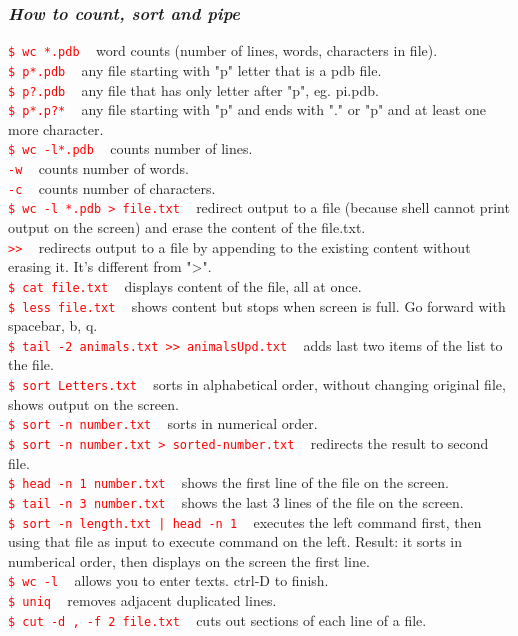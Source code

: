 \documentclass{article}
\begin{document}
{\subsubsection{\small\textsl{How to count, sort and pipe}}
\textcolor{red}{\texttt{\$ wc *.pdb}} ~ word counts (number of lines, words, characters in file). \\
\textcolor{red}{\texttt{\$ p*.pdb}} ~	any file starting with "p" letter that is a pdb file.\\
\textcolor{red}{\texttt{\$ p?.pdb}} ~ any file that has only letter after "p", eg. pi.pdb.\\
\textcolor{red}{\texttt{\$ p*.p?*}} ~	 any file starting with "p" and ends with "." or "p" and at least one more character.\\
\textcolor{red}{\texttt{\$ wc -l*.pdb}} ~	 counts number of lines.\\
\indent\indent \textcolor{red}{\texttt{-w}} ~	counts number of words.\\ 
\indent\indent \textcolor{red}{\texttt{-c}} ~	counts number of characters.\\
\textcolor{red}{\texttt{\$ wc -l *.pdb > file.txt}} ~	 redirect output to a file (because shell cannot print output on the screen) and erase the content of the file.txt. \\
\textcolor{red}{\texttt{>>}} ~	redirects output to a file by appending to the existing content without erasing it. It's different from ">".\\
\textcolor{red}{\texttt{\$ cat file.txt}} ~ displays content of the file, all at once.\\
\textcolor{red}{\texttt{\$ less file.txt}} ~	shows content but stops when screen is full. Go forward with spacebar, b, q. \\
\textcolor{red}{\texttt{\$ tail -2 animals.txt >> animalsUpd.txt}} ~	adds last two items of the list to the file.\\
\textcolor{red}{\texttt{\$ sort Letters.txt}} ~  sorts in alphabetical order, without changing original file, shows output on the screen.\\
\textcolor{red}{\texttt{\$ sort -n number.txt}} ~	sorts in numerical order.\\
\textcolor{red}{\texttt{\$ sort -n number.txt > sorted-number.txt}} ~ redirects the result to second file.\\
\textcolor{red}{\texttt{\$ head -n 1 number.txt}} ~ shows the first line of the file on the screen.\\
\textcolor{red}{\texttt{\$ tail -n 3 number.txt}} ~ shows the last 3 lines of the file on the screen.\\
\textcolor{red}{\texttt{\$ sort -n length.txt | head -n 1}} ~  executes the left command first, then using that file as input to execute command on the left. Result: it sorts in numberical order, then displays on the screen the first line.\\
\textcolor{red}{\texttt{\$ wc -l}} ~ 	allows you to enter texts. ctrl-D to finish.\\
\textcolor{red}{\texttt{\$ uniq}} ~ removes adjacent duplicated lines.\\
\textcolor{red}{\texttt{\$ cut -d , -f 2 file.txt}} ~ cuts out sections of each line of a file.\\
}
\end{document}
